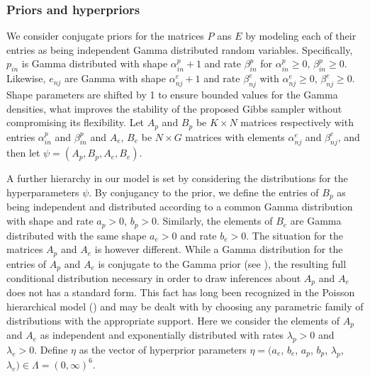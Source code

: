 \documentclass{bioinfo}
\begin{document}
\subsubsection{Priors and hyperpriors} 
We consider conjugate priors for the matrices $P$ ans $E$ by modeling
each of their entries as being independent Gamma distributed random
variables. Specifically, $p_{in}$ is Gamma distributed with shape
$\alpha_{in}^p + 1$ and rate $\beta_{in}^p$ for $\alpha_{in}^p
\geqslant 0$, $\beta_{in}^p \geqslant 0$. Likewise, $e_{nj}$ are Gamma
with shape $\alpha_{nj}^e+1$ and rate $\beta_{nj}^e$ with
$\alpha_{nj}^e \geqslant 0$, $\beta_{nj}^e \geqslant 0$. Shape
parameters are shifted by 1 to ensure bounded values for the Gamma
densities, what improves the stability of the proposed Gibbs sampler 
without compromising its flexibility. Let
$A_p$ and $B_p$ be $K\times N$ matrices respectively with entries
$\alpha_{in}^p$ and $\beta_{in}^p$ and $A_e$, $B_e$ be $N\times G$
matrices with elements $\alpha_{nj}^e$ and $\beta_{nj}^e$, and then
let $\psi = (A_p, B_p, A_e, B_e)$.


A further hierarchy in our model is set by considering the
distributions for the hyperparameters $\psi$. By conjugancy to the
prior, we define the entries of $B_p$ as being independent and
distributed according to a common Gamma distribution with shape and
rate $a_p > 0$, $b_p > 0$. Similarly, the elements of $B_e$ are Gamma
distributed with the same shape $a_e>0$ and rate $b_e>0$. The
situation for the matrices $A_p$ and $A_e$ is however different. While
a Gamma distribution for the entries of $A_p$ and $A_e$ is conjugate
to the Gamma prior (see \citealp{M}), the resulting full conditional
distribution necessary in order to draw inferences about $A_p$ and
$A_e$ does not has a standard form.  This fact has long been
recognized in the Poisson hierarchical model (\citealp{GMS93}) and may
be dealt with by choosing any parametric family of
distributions with the appropriate support. Here we consider the
elements of $A_p$ and $A_e$ as independent and exponentially
distributed with rates $\lambda_p > 0$ and $\lambda_e > 0$.  Define
$\eta$ as the vector of hyperprior parameters $\eta = (a_e$, $b_e$,
$a_p$, $b_p$, $\lambda_p$, $\lambda_e) \in \Lambda = (0, \infty)^6$.
\end{document}
